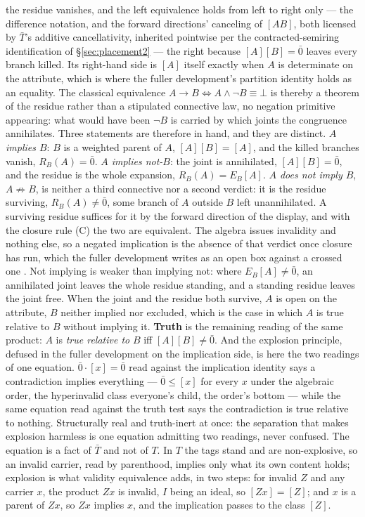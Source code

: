the residue vanishes, and the left equivalence holds from left to right only --- the difference notation, and the forward directions' canceling of $[AB]$, both licensed by $\bar{T}$'s additive cancellativity, inherited pointwise per the contracted-semiring identification of \S\ref{sec:placement2} --- the right because $[A][B] = \bar{0}$ leaves every branch killed. Its right-hand side is $[A]$ itself exactly when $A$ is determinate on the attribute, which is where the fuller development's partition identity holds as an equality. The classical equivalence $A \to B \iff A \wedge \lnot B \equiv \bot$ is thereby a theorem of the residue rather than a stipulated connective law, no negation primitive appearing: what would have been $\lnot B$ is carried by which joints the congruence annihilates. Three statements are therefore in hand, and they are distinct. \emph{$A$ implies $B$}: $B$ is a weighted parent of $A$, $[A][B] = [A]$, and the killed branches vanish, $R_B(A) = \bar{0}$. \emph{$A$ implies not-$B$}: the joint is annihilated, $[A][B] = \bar{0}$, and the residue is the whole expansion, $R_B(A) = E_B[A]$. \emph{$A$ does not imply $B$}, $A \not\Rightarrow B$, is neither a third connective nor a second verdict: it is the residue surviving, $R_B(A) \neq \bar{0}$, some branch of $A$ outside $B$ left unannihilated. A surviving residue suffices for it by the forward direction of the display, and with the closure rule (C) the two are equivalent. The algebra issues invalidity and nothing else, so a negated implication is the absence of that verdict once closure has run, which the fuller development writes as an open box against a crossed one \cite{Aethus}. Not implying is weaker than implying not: where $E_B[A] \neq \bar{0}$, an annihilated joint leaves the whole residue standing, and a standing residue leaves the joint free. When the joint and the residue both survive, $A$ is open on the attribute, $B$ neither implied nor excluded, which is the case in which $A$ is true relative to $B$ without implying it. \textbf{Truth} is the remaining reading of the same product: $A$ is \emph{true relative to} $B$ iff $[A][B] \neq \bar{0}$. And the explosion principle, defused in the fuller development on the implication side, is here the two readings of one equation. $\bar{0}\cdot[x] = \bar{0}$ read against the implication identity says a contradiction implies everything --- $\bar{0} \leq [x]$ for every $x$ under the algebraic order, the hyperinvalid class everyone's child, the order's bottom --- while the same equation read against the truth test says the contradiction is true relative to nothing. Structurally real and truth-inert at once: the separation that makes explosion harmless is one equation admitting two readings, never confused. The equation is a fact of $\bar{T}$ and not of $T$. In $T$ the tags stand and are non-explosive, so an invalid carrier, read by parenthood, implies only what its own content holds; explosion is what validity equivalence adds, in two steps: for invalid $Z$ and any carrier $x$, the product $Zx$ is invalid, $I$ being an ideal, so $[Zx] = [Z]$; and $x$ is a parent of $Zx$, so $Zx$ implies $x$, and the implication passes to the class $[Z]$.
